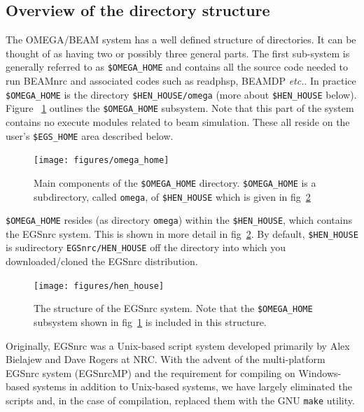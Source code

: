 \documentclass[12pt,twoside]{article}
\newcommand{\etc}{{\em etc.}}
\begin{document}
\subsection{Overview of the directory structure}
\label{dirstructsect}

The OMEGA/BEAM system has a well defined structure of directories.  It
can be thought of as having two or possibly three general parts.  The
first sub-system is generally referred to as \verb+$OMEGA_HOME+ and
contains all the source code needed to run BEAMnrc and
associated codes such as readphsp, BEAMDP \etc.   In practice
\verb+$OMEGA_HOME+ is the directory {\tt \$HEN\_HOUSE/omega} (more
about {\tt \$HEN\_HOUSE} below).  Figure
~\ref{fig_omega_home} outlines the \verb+$OMEGA_HOME+ subsystem.
Note that this part of
the system contains no execute modules related to beam simulation.
These all reside on the user's {\tt \$EGS\_HOME} area described below.

\begin{figure}[hbp]
\begin{center}
\leavevmode
\mbox{}\hspace{0cm}
\texttt{[image: figures/omega\_home]}
\caption[Components of {\tt \$OMEGA\_HOME} subdirectory.]
{Main components of the {\tt \$OMEGA\_HOME} directory.
{\tt \$OMEGA\_HOME} is a subdirectory, called {\tt omega}, of
{\tt \$HEN\_HOUSE} which is given in fig~\ref{fig_hen_house}}
\label{fig_omega_home}
\end{center}
\end{figure}

{\tt \$OMEGA\_HOME} resides (as directory {\tt omega})
within the {\tt \$HEN\_HOUSE}, which contains the EGSnrc system.
This is shown in more detail in fig~\ref{fig_hen_house}.  By default,
{\tt \$HEN\_HOUSE} is sudirectory {\tt EGSnrc/HEN\_HOUSE} off the
directory into which you downloaded/cloned the EGSnrc distribution.
\begin{figure}[hbp]
\begin{center}
\leavevmode
\mbox{}
\hspace*{-1cm}
\texttt{[image: figures/hen\_house]}
\caption[Structure of EGSnrc directory, {\em i.e.~} the {\tt \$HEN\_HOUSE}.]
{The structure of the
EGSnrc system. Note that the {\tt \$OMEGA\_HOME} subsystem shown in
fig~\ref{fig_omega_home} is included in this structure.
}
 
\label{fig_hen_house}
\end{center}
\end{figure}
Originally, EGSnrc was a Unix-based script system developed primarily by
Alex Bielajew and Dave Rogers at NRC.  With the advent of the multi-platform
EGSnrc system (EGSnrcMP\cite{Ka03}) and the requirement for compiling on
Windows-based systems in addition to Unix-based systems, we have largely
eliminated the scripts and, in the case of compilation, replaced them with the
GNU {\tt make} utility.
\end{document}
